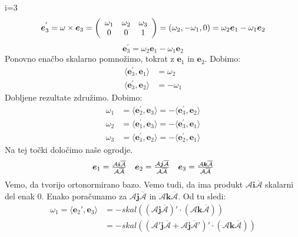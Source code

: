 \documentclass[mat1]{fmfdelo}
\newcommand{\ii}{\boldsymbol i}
\newcommand{\jj}{\boldsymbol j}
\newcommand{\kk}{\boldsymbol k}
\newcommand{\e}{\boldsymbol e}
\newcommand{\A}{\mathcal A}
\begin{document}
\begin{dokaz}
i=3
\begin{equation*}
\e_3^{'} = \omega \times \e_3 = \left(
\begin{array}{c c c}
\omega_1 & \omega_2 & \omega_3 \\
0 & 0 & 1
\end{array} \right)
= (\omega_2, -\omega_1,0) = \omega_2\e_1 - \omega_1\e_2
\end{equation*}
\begin{equation*}
\e_3^{'} = \omega_2\e_1-\omega_1\e_2
\end{equation*}
Ponovno enačbo skalarno pomnožimo, tokrat z $\e_1$ in $\e_2$. Dobimo:
\begin{equation*}
\begin{split}
\langle \e_3^{'}, \e_1 \rangle & = \omega_2 \\
\langle \e_3^{'}, \e_2 \rangle &= -\omega_1
\end{split}
\end{equation*}
Dobljene rezultate združimo. Dobimo:
\begin{equation}
\begin{split}
\omega_1 &= \langle \e_2^{'}, \e_3 \rangle = - \langle \e_3^{'}, \e_2 \rangle \\
\omega_2 &= \langle \e_1^{'}, \e_3 \rangle = - \langle \e_3^{'}, \e_1 \rangle \\
\omega_3 &= \langle \e_1^{'}, \e_2 \rangle = - \langle \e_2^{'}, \e_1 \rangle 
\end{split}
\end{equation}
Na tej točki določimo naše ogrodje.
\begin{equation*}
\begin{array}{c c c}
\e_1 = \frac{\A \ii \overline{\A}}{\A \overline{\A}} &
\e_2 = \frac{\A \jj \overline{\A}}{\A \overline{\A}} &
\e_3 = \frac{\A \kk \overline{\A}}{\A \overline{\A}}
\end{array}
\end{equation*}
Vemo, da tvorijo ortonormirano bazo. Vemo tudi, da ima produkt $\A \ii \overline{\A}$ skalarni del enak 0. Enako poračunamo za $\A \jj \overline{\A}$ in $\A \kk \overline{\A}$. Od tu sledi:
\begin{equation*}
\begin{split}
	\omega_1 = \langle \e_2', \e_3 \rangle& = -skal \left( \left( \A \jj \overline{\A} \right)' \cdot \left( \A \kk \overline{\A}  \right) \right) \\
	&= -skal \left( \left( \A' \jj \overline{\A} + \A \jj \overline{\A}' \right)' \cdot \left( \A \kk \overline{\A}  \right) \right) \\

\end{split}
\end{equation*}
\end{dokaz}
\end{document}
